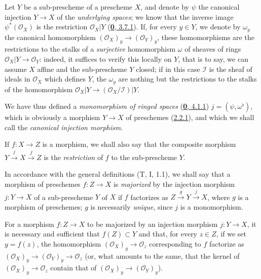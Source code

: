 \begin{env}[4.1.7]
\label{I.4.1.7}
Let $Y$ be a sub-prescheme of a prescheme $X$, and denote by $\psi$
the canonical injection $Y\to X$ of the \emph{underlying spaces}; we know that
the inverse image $\psi^*(\mathscr{O}_X)$ is the restriction
$\mathscr{O}_X|Y$ (\hyperref[0.3.7.1]{\textbf{0}, 3.7.1}). If, for every $y\in Y$,
we denote by $\omega_y$ the canonical homomorphism
$(\mathscr{O}_X)_y\to(\mathscr{O}_Y)_y$, these homomorphisms are the
restrictions to the stalks of a \emph{surjective} homomorphism $\omega$ of
sheaves of rings $\mathscr{O}_X|Y\to\mathscr{O}_Y$: indeed, it suffices to
verify this locally on $Y$, that is to say, we can assume $X$
affine and the sub-prescheme $Y$ closed; if in this case $\mathscr{I}$ is the
sheaf of ideals in $\mathscr{O}_X$ which defines $Y$, the $\omega_y$ are
nothing but the restrictions to the stalks of the homomorphism
$\mathscr{O}_X|Y\to(\mathscr{O}_X/\mathscr{I})|Y$.

We have thus defined a \emph{monomorphism of ringed spaces}
(\hyperref[0.4.1.1]{\textbf{0}, 4.1.1}) $j=(\psi,\omega^\flat)$, which is obviously a
morphism $Y\to X$ of preschemes (\hyperref[I.2.2.1]{2.2.1}), and which we
shall call the \emph{canonical injection morphism}.

If $f:X\to Z$ is a morphism, we shall also say that the composite morphism
$Y\xrightarrow{j}X\xrightarrow{f}Z$ is the \emph{restriction} of $f$ to the
sub-prescheme $Y$.
\end{env}

\begin{env}[4.1.8]
\label{I.4.1.8}
In accordance with the general definitions (T, I, 1.1), we shall say that a
morphism of preschemes $f:Z\to X$ is \emph{majorized} by the injection
morphism $j:Y\to X$ of a sub-prescheme $Y$ of $X$ if $f$ factorizes as
$Z\xrightarrow{g}Y\xrightarrow{j}X$, where $g$ is a morphism of preschemes;
$g$ is necessarily \emph{unique}, since $j$ is a monomorphism.
\end{env}

\begin{proposition}[4.1.9]
\label{I.4.1.9}
For a morphism $f:Z\to X$ to be majorized by an injection
morphism $j:Y\to X$, it is necessary and sufficient that $f(Z)\subset Y$
and that, for every $z\in Z$, if we set $y=f(z)$, the homomorphism
$(\mathscr{O}_X)_y\to\mathscr{O}_z$ corresponding to $f$ factorize as
$(\mathscr{O}_X)_y\to(\mathscr{O}_Y)_y\to\mathscr{O}_z$ (\textup{or, what amounts
to the same, that} the kernel of $(\mathscr{O}_X)_y\to\mathscr{O}_z$ contain
that of $(\mathscr{O}_X)_y\to(\mathscr{O}_Y)_y$).
\end{proposition}

